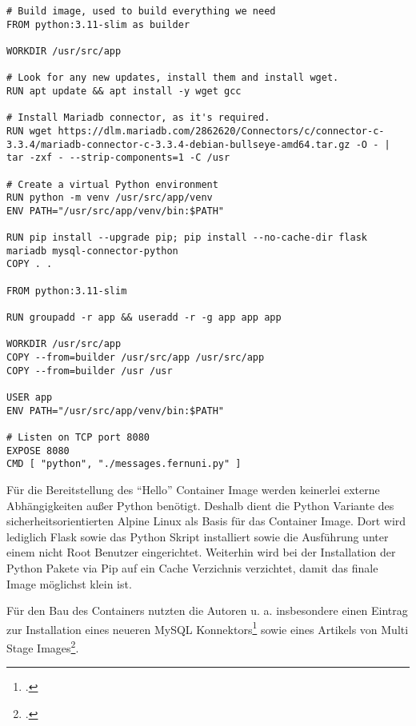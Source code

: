 \begin{verbatim}
# Build image, used to build everything we need
FROM python:3.11-slim as builder

WORKDIR /usr/src/app

# Look for any new updates, install them and install wget.
RUN apt update && apt install -y wget gcc

# Install Mariadb connector, as it's required.
RUN wget https://dlm.mariadb.com/2862620/Connectors/c/connector-c-3.3.4/mariadb-connector-c-3.3.4-debian-bullseye-amd64.tar.gz -O - | tar -zxf - --strip-components=1 -C /usr

# Create a virtual Python environment
RUN python -m venv /usr/src/app/venv
ENV PATH="/usr/src/app/venv/bin:$PATH"

RUN pip install --upgrade pip; pip install --no-cache-dir flask mariadb mysql-connector-python
COPY . .

FROM python:3.11-slim

RUN groupadd -r app && useradd -r -g app app app

WORKDIR /usr/src/app
COPY --from=builder /usr/src/app /usr/src/app
COPY --from=builder /usr /usr

USER app
ENV PATH="/usr/src/app/venv/bin:$PATH"

# Listen on TCP port 8080
EXPOSE 8080
CMD [ "python", "./messages.fernuni.py" ]
\end{verbatim}

Für die Bereitstellung des \enquote{Hello} Container Image werden keinerlei externe Abhängigkeiten außer Python benötigt. Deshalb dient die Python Variante des sicherheitsorientierten Alpine Linux als Basis für das Container Image. Dort wird lediglich Flask sowie das Python Skript installiert sowie die Ausführung unter einem nicht Root Benutzer eingerichtet. Weiterhin wird bei der Installation der Python Pakete via Pip auf ein Cache Verzichnis verzichtet, damit das finale Image möglichst klein ist.

Für den Bau des Containers nutzten die Autoren u. a. insbesondere einen Eintrag zur Installation eines neueren MySQL Konnektors\footcite[Vgl.][]{Danblack_answer_2022} sowie eines Artikels von Multi Stage Images\footcite[Vgl.][]{turner-trauring_multi-stage_2019}.

